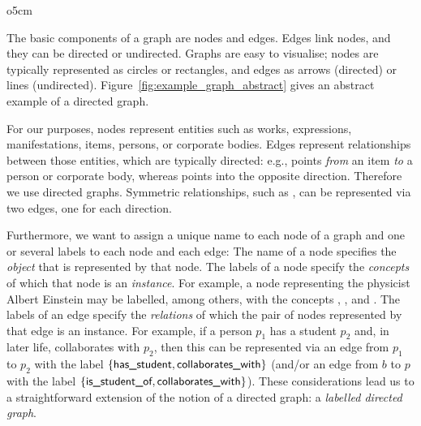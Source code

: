 \begin{wrapfigure}{o}{5cm}
  \centering
  \caption{A directed graph}
  \label{fig:example_graph_abstract}
\end{wrapfigure}

The basic components of a graph are nodes and edges. Edges link nodes, and they can be directed
or undirected. Graphs are easy to visualise; nodes are typically represented as circles
or rectangles, and edges as arrows (directed) or lines (undirected).
Figure~\ref{fig:example_graph_abstract} gives an abstract example of a directed graph.

For our purposes,
nodes represent entities such as works, expressions, manifestations, items,
persons, or corporate bodies.
Edges represent relationships between those entities, which are typically directed:
e.g.,  points \emph{from} an item
\emph{to} a person or corporate body,
whereas  points into the opposite direction.
Therefore we use directed graphs.
Symmetric relationships, such as ,
can be represented via two edges, one for each direction.

Furthermore, we want to assign a unique name to each node of a graph
and one or several labels to each node and each edge:
The name of a node specifies the \emph{object} that is represented by that node.
The labels of a node specify the \emph{concepts}
of which that node is an \emph{instance}.
For example, a node representing the physicist Albert Einstein
may be labelled, among others, with the concepts , ,
and .
The labels of an edge specify the \emph{relations} of which the pair of nodes
represented by that edge is an instance.
For example, if a person $p_1$ has a student $p_2$ and, in later life, 
collaborates with $p_2$, then this can be represented via an edge from $p_1$ to $p_2$
with the label $\{\textsf{has\_student},\textsf{collaborates\_with}\}$
(and/or an edge from $b$ to $p$ with the label $\{\textsf{is\_student\_of},\textsf{collaborates\_with}\}$).
These considerations lead us to a straightforward extension
of the notion of a directed graph:
a \emph{labelled directed graph}.

